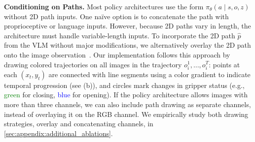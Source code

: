 \textbf{Conditioning on Paths.} Most policy architectures use the form \(\pi_\theta(a \mid s, o, z)\) without 2D path inputs. One na\"ive option is to concatenate the path with proprioceptive or language inputs. However, because 2D paths vary in length, the architecture must handle variable-length inputs. To incorporate the 2D path \(\hat{p}\) from the VLM without major modifications, we alternatively overlay the 2D path onto the image observation~\citep{gu2023rttrajectory}. Our implementation follows this approach by drawing colored trajectories on all images in the trajectory \(o_i^1, \ldots, o_i^T\): points at each \((x_t, y_t)\) are connected with line segments using a color gradient to indicate temporal progression (see (b)), and circles mark changes in gripper status (e.g., \textcolor{green}{green} for closing, \textcolor{blue}{blue} for opening). If the policy architecture allows images with more than three channels, we can also include path drawing as separate channels, instead of overlaying it on the RGB channel. We empirically study both drawing strategies, overlay and concatenating channels, in \cref{sec:appendix:additional_ablations}.




